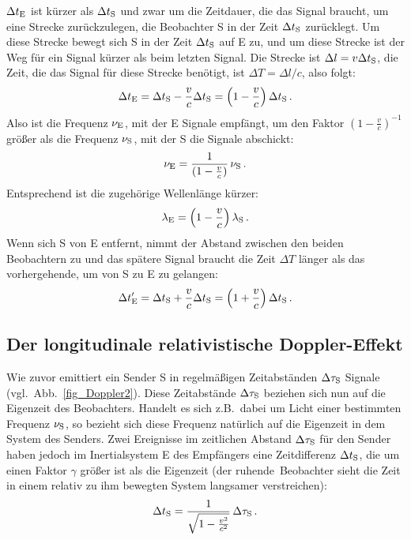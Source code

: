 $\Delta t_{\rm E}$ ist k\"urzer als $\Delta t_{\rm S}$ und
zwar um die Zeitdauer, 
die das Signal braucht, um eine Strecke zur\"uckzulegen,
die Beobachter S in der Zeit $\Delta t_{\rm S}$ zur\"ucklegt.
Um diese Strecke bewegt sich S in der Zeit $\Delta t_{\rm S}$
auf E zu, und um diese Strecke ist der Weg f\"ur ein
Signal k\"urzer als beim letzten Signal. Die Strecke
ist $\Delta l = v \Delta t_{\rm S}$, die Zeit, die das Signal
f\"ur diese Strecke ben\"otigt, ist $\Delta T=\Delta l/c$,
also folgt:
\begin{equation}
          \Delta t_{\rm E} = \Delta t_{\rm S} - \frac{v}{c} \Delta t_{\rm S} =
           \left( 1 - \frac{v}{c} \right) \Delta t_{\rm S} \, .
\end{equation}
Also ist die Frequenz $\nu_{\rm E}$, mit der E Signale 
empf\"angt, um den Faktor $(1-\frac{v}{c})^{-1}$ 
gr\"o\ss er als die Frequenz $\nu_{\rm S}$, mit der S 
die Signale abschickt:
\begin{equation}
      \nu_{\rm E} = \frac{1}{(1 - \frac{v}{c})} \, \nu_{\rm S} \, .
\end{equation} 
Entsprechend ist die zugeh\"orige Wellenl\"ange
k\"urzer:
\begin{equation}
       \lambda_{\rm E} = \left( 1 - \frac{v}{c} \right) \lambda_{\rm S} \, .
\end{equation}
Wenn sich S von E entfernt, nimmt der Abstand
zwischen den beiden Beobachtern zu und das
sp\"atere Signal braucht die Zeit $\Delta T$ l\"anger
als das vorhergehende, um 
von S zu E zu gelangen:
\begin{equation}
          \Delta t_{\rm E}' = \Delta t_{\rm S} + \frac{v}{c} \Delta t_{\rm S} =
           \left( 1 + \frac{v}{c} \right) \Delta t_{\rm S} \, .
\end{equation}

\subsection{Der longitudinale relativistische Doppler-Effekt}

Wie zuvor emittiert  ein Sender S in regelm\"a\ss igen
Zeitabst\"anden $\Delta \tau_{\rm S}$ Signale 
(vgl.\ Abb.\ \ref{fig_Doppler2}). Diese Zeitabst\"ande
$\Delta \tau_{\rm S}$ beziehen sich nun auf die Eigenzeit des
Beobachters. Handelt es sich z.B.\ dabei um Licht einer 
bestimmten Frequenz $\nu_{\rm S}$, so bezieht sich diese
Frequenz nat\"urlich auf die Eigenzeit in dem System
des Senders. Zwei Ereignisse im zeitlichen Abstand
$\Delta \tau_{\rm S}$ f\"ur den Sender haben jedoch im
Inertialsystem E des Empf\"angers eine Zeitdifferenz
$\Delta t_{\rm S}$, die um einen Faktor $\gamma$ gr\"o\ss er
ist als die Eigenzeit (der \glqq ruhende\grqq\ Beobachter
sieht die Zeit in einem relativ zu ihm bewegten System
langsamer verstreichen):
\begin{equation}
         \Delta t_{\rm S} = \frac{1}{\sqrt{1 - \frac{v^2}{c^2}}} 
         \, \Delta \tau_{\rm S} \, .
\end{equation}

